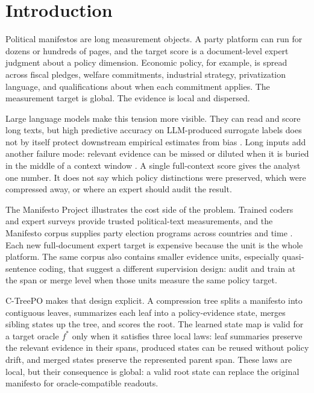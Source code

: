 \section{Introduction}\label{sec:v8-introduction}

Political manifestos are long measurement objects. A party platform can run
for dozens or hundreds of pages, and the target score is a document-level
expert judgment about a policy dimension. Economic policy, for example, is
spread across fiscal pledges, welfare commitments, industrial strategy,
privatization language, and qualifications about when each commitment applies.
The measurement target is global. The evidence is local and dispersed.

Large language models make this tension more visible. They can read and score
long texts, but high predictive accuracy on LLM-produced surrogate labels does
not by itself protect downstream empirical estimates from bias
\citep{EgamiEtAl2024}. Long inputs add another failure mode: relevant evidence
can be missed or diluted when it is buried in the middle of a context window
\citep{LiuEtAl2024LostMiddle}. A single full-context score gives the analyst
one number. It does not say which policy distinctions were preserved, which
were compressed away, or where an expert should audit the result.

The Manifesto Project illustrates the cost side of the problem. Trained coders
and expert surveys provide trusted political-text measurements, and the
Manifesto corpus supplies party election programs across countries and time
\citep{ManifestoProject2025a,ManifestoCorpus2025}. Each new full-document
expert target is expensive because the unit is the whole platform. The same
corpus also contains smaller evidence units, especially quasi-sentence coding,
that suggest a different supervision design: audit and train at the span or
merge level when those units measure the same policy target.

C-TreePO makes that design explicit. A compression tree splits a manifesto into
contiguous leaves, summarizes each leaf into a policy-evidence state, merges
sibling states up the tree, and scores the root. The learned state map is
valid for a target oracle \(f^\ast\) only when it satisfies three local laws:
leaf summaries preserve the relevant evidence in their spans, produced states
can be reused without policy drift, and merged states preserve the represented
parent span. These laws are local, but their consequence is global: a valid
root state can replace the original manifesto for oracle-compatible readouts.

